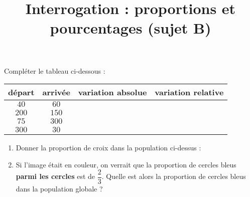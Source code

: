 \documentclass[
	classe=$2^{de}$,
	landscape,
	twocolumn,
	headerTitle={Interrogation 15 min.}
]{évaluation}
\begin{document}
\begin{exercice}
	Compléter le tableau ci-dessous :
	\begin{center}
		\begin{tabular}{|c|c|c|c|}
			\hline
			départ & arrivée & variation absolue   & variation relative   \\ \hline
			$40$   & $60$    & \correction{$20$}   & \correction{$0,5$}   \\ \hline
			$200$  & $150$   & \correction{$-50$}  & \correction{$-0,25$} \\ \hline
			$75$   & $300$   & \correction{$225$}  & \correction{$3$}     \\ \hline
			$300$  & $30$    & \correction{$-270$} & \correction{$-0,9$}  \\ \hline
		\end{tabular}
	\end{center}
\end{exercice}

\newpage
\setcounter{exercice}{1}

\title{Interrogation : proportions et pourcentages (sujet B)}
\maketitle

\begin{exercice}
	\begin{center}
	\end{center}

	\begin{enumerate}
		\item Donner la proportion de croix dans la population ci-dessus : 
		\item Si l'image était en couleur, on verrait que la proportion de cercles bleus \textbf{parmi les cercles} est de $\dfrac{2}{3}$. Quelle est alors la proportion de cercles bleus dans la population globale ? 
	\end{enumerate}
\end{exercice}
\end{document}
